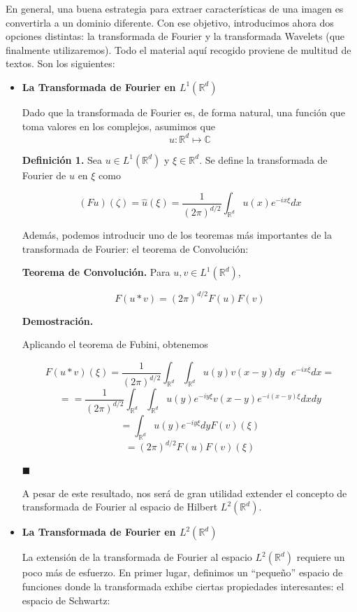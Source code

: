 En general, una buena estrategia para extraer características de una imagen es convertirla a un dominio diferente. Con ese objetivo, introducimos ahora dos opciones distintas: la transformada de Fourier y la transformada Wavelets (que finalmente utilizaremos). Todo el material aquí recogido proviene de multitud de textos. Son los siguientes: \cite{math-image}

\begin{itemize}
	\item \textbf{La Transformada de Fourier en $L^1(\mathbb{R}^d)$}
	
	Dado que la transformada de Fourier es, de forma natural, una función que toma valores en los complejos, asumimos que
	$$u: \mathbb{R}^d \mapsto \mathbb{C}$$
	
	\textbf{Definición 1.} Sea $u \in L^1(\mathbb{R}^d)$ y $\xi \in \mathbb{R}^d$. Se define la transformada de Fourier de $u$ en $\xi$ como 
	
	$$(F u)(\zeta) = \hat{u}(\xi) = \frac{1}{(2\pi)^{d/2}} \int_{\mathbb{R}^d} u(x) e^{-ix\xi}dx$$


Además, podemos introducir uno de los teoremas más importantes de la transformada de Fourier: el teorema de Convolución: 

\textbf{Teorema de Convolución.} Para $u, v \in L^1(\mathbb{R}^d)$,

$$ F(u*v) = (2\pi)^{d/2}F(u)F(v)$$

\textbf{Demostración.}


Aplicando el teorema de Fubini, obtenemos

$$F(u*v)(\xi) = \frac{1}{(2\pi)^{d/2}} \int_{\mathbb{R}^d} \int_{\mathbb{R}^d} u(y) v(x-y) dy\text{ } e^{-ix\xi} dx = $$
$$ == \frac{1}{(2\pi)^{d/2}} \int_{\mathbb{R}^d} \int_{\mathbb{R}^d} u(y)e^{-iy\xi}v(x-y)e^{-i(x-y)\xi}dxdy$$
$$ = \int_{\mathbb{R}^d} u(y) e^{-iy\xi} dy F(v)(\xi)$$
$$ = (2\pi)^{d/2}F(u)F(v)(\xi)$$

\hfill$\blacksquare$

A pesar de este resultado, nos será de gran utilidad extender el concepto de transformada de Fourier al espacio de Hilbert $L^2(\mathbb{R}^d)$.

\item \textbf{La Transformada de Fourier en $L^2(\mathbb{R}^d)$}

La extensión de la transformada de Fourier al espacio $L^2(\mathbb{R}^d)$ requiere un poco más de esfuerzo. En primer lugar, definimos un ``pequeño'' espacio de funciones donde la transformada exhibe ciertas propiedades interesantes: el espacio de Schwartz:


\end{itemize}
